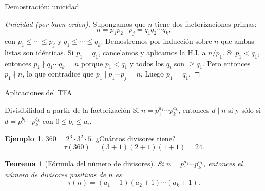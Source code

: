 \documentclass[10pt,aspectratio=169]{beamer}
\theoremstyle{definition}
\newtheorem{ejemplo}{Ejemplo}
\theoremstyle{plain}
\newtheorem{teorema}{Teorema}
\theoremstyle{remark}
\begin{document}
\begin{frame}{Demostración: unicidad}
  \begin{proof}[Unicidad (por buen orden)]
    Supongamos que $n$ tiene dos factorizaciones primas:
    \[
      n = p_1 p_2\cdots p_j = q_1 q_2\cdots q_k,
    \]
    con $p_1\le\cdots\le p_j$ y $q_1\le\cdots\le q_k$. Demostremos por
    inducción sobre $n$ que ambas listas son idénticas.
    \vspace{0.2em}
    Si $p_1=q_1$, cancelamos y aplicamos la H.I. a $n/p_1$.
    \vspace{0.2em}
    Si $p_1<q_1$, entonces $p_1\nmid q_1\cdots q_k=n$ porque $p_1<q_1$
    y todos los $q_i$ son $\ge q_1$. Pero entonces $p_1\nmid n$, lo que
    contradice que $p_1\mid p_1\cdots p_j = n$. Luego $p_1=q_1$.
  \end{proof}
\end{frame}

\begin{frame}{Aplicaciones del TFA}
  \begin{block}{Divisibilidad a partir de la factorización}
    Si $n=p_1^{a_1}\cdots p_k^{a_k}$, entonces $d\mid n$ si y sólo si
    $d=p_1^{b_1}\cdots p_k^{b_k}$ con $0\le b_i\le a_i$.
  \end{block}
  \begin{ejemplo}
    $360 = 2^3\cdot 3^2\cdot 5$. ¿Cuántos divisores tiene?
    \[
      \tau(360) = (3+1)(2+1)(1+1) = 24.
    \]
  \end{ejemplo}
  \begin{teorema}[Fórmula del número de divisores]
    Si $n=p_1^{a_1}\cdots p_k^{a_k}$, entonces el número de divisores
    positivos de $n$ es
    \[
      \tau(n) = (a_1+1)(a_2+1)\cdots(a_k+1).
    \]
  \end{teorema}
\end{frame}

\end{document}
